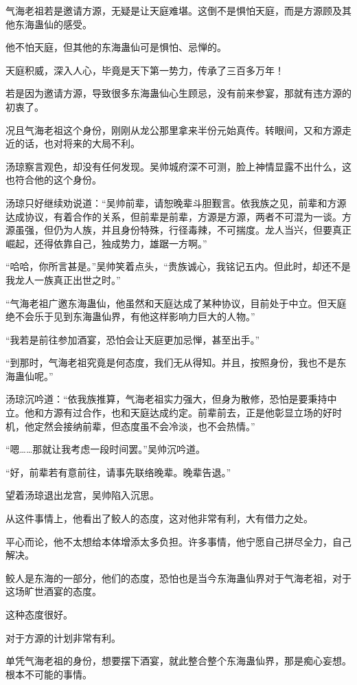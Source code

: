 \begin{this_body}
气海老祖若是邀请方源，无疑是让天庭难堪。这倒不是惧怕天庭，而是方源顾及其他东海蛊仙的感受。

他不怕天庭，但其他的东海蛊仙可是惧怕、忌惮的。

天庭积威，深入人心，毕竟是天下第一势力，传承了三百多万年！

若是因为邀请方源，导致很多东海蛊仙心生顾忌，没有前来参宴，那就有违方源的初衷了。

况且气海老祖这个身份，刚刚从龙公那里拿来半份元始真传。转眼间，又和方源走近的话，也对将来的大局不利。

汤琼察言观色，却没有任何发现。吴帅城府深不可测，脸上神情显露不出什么，这也符合他的这个身份。

汤琼只好继续劝说道：“吴帅前辈，请恕晚辈斗胆觐言。依我族之见，前辈和方源达成协议，有着合作的关系，但前辈是前辈，方源是方源，两者不可混为一谈。方源虽强，但仍为人族，并且身份特殊，行径毒辣，不可揣度。龙人当兴，但要真正崛起，还得依靠自己，独成势力，雄踞一方啊。”

“哈哈，你所言甚是。”吴帅笑着点头，“贵族诚心，我铭记五内。但此时，却还不是我龙人一族真正出世之时。”

“气海老祖广邀东海蛊仙，他虽然和天庭达成了某种协议，目前处于中立。但天庭绝不会乐于见到东海蛊仙界，有他这样影响力巨大的人物。”

“我若是前往参加酒宴，恐怕会让天庭更加忌惮，甚至出手。”

“到那时，气海老祖究竟是何态度，我们无从得知。并且，按照身份，我也不是东海蛊仙呢。”

汤琼沉吟道：“依我族推算，气海老祖实力强大，但身为散修，恐怕是要秉持中立。他和方源有过合作，也和天庭达成约定。前辈前去，正是他彰显立场的好时机，他定然会接纳前辈，但态度虽不会冷淡，也不会热情。”

“嗯……那就让我考虑一段时间罢。”吴帅沉吟道。

“好，前辈若有意前往，请事先联络晚辈。晚辈告退。”

望着汤琼退出龙宫，吴帅陷入沉思。

从这件事情上，他看出了鲛人的态度，这对他非常有利，大有借力之处。

平心而论，他不太想给本体增添太多负担。许多事情，他宁愿自己拼尽全力，自己解决。

鲛人是东海的一部分，他们的态度，恐怕也是当今东海蛊仙界对于气海老祖，对于这场旷世酒宴的态度。

这种态度很好。

对于方源的计划非常有利。

单凭气海老祖的身份，想要摆下酒宴，就此整合整个东海蛊仙界，那是痴心妄想。根本不可能的事情。


\end{this_body}
